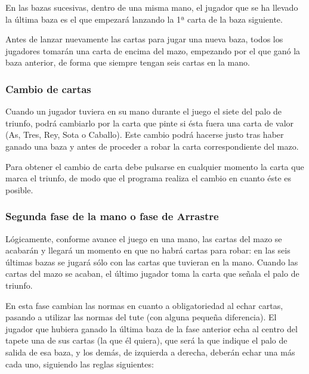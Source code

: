 \documentclass{article}
\begin{document}
En las bazas sucesivas, dentro de una misma mano, el jugador que se ha llevado la última baza es el que empezará lanzando la 1ª carta de la baza siguiente.

Antes de lanzar nuevamente las cartas para jugar una nueva baza, todos los jugadores tomarán una carta de encima del mazo, empezando por el que ganó la baza anterior, de forma que siempre tengan seis cartas en la mano.

\subsubsection*{Cambio de cartas}

Cuando un jugador tuviera en su mano durante el juego el siete del palo de triunfo, podrá cambiarlo por la carta que pinte si ésta fuera una carta de valor (As, Tres, Rey, Sota o Caballo). Este cambio podrá hacerse justo tras haber ganado una baza y antes de proceder a robar la carta correspondiente del mazo.

Para obtener el cambio de carta debe pulsarse en cualquier momento la carta que marca el triunfo, de modo que el programa realiza el cambio en cuanto éste es posible.

\subsubsection*{Segunda fase de la mano o fase de Arrastre}

Lógicamente, conforme avance el juego en una mano, las cartas del mazo se acabarán y llegará un momento en que no habrá cartas para robar: en las seis últimas bazas se jugará sólo con las cartas que tuvieran en la mano. Cuando las cartas del mazo se acaban, el último jugador toma la carta que señala el palo de triunfo.

En esta fase cambian las normas en cuanto a obligatoriedad al echar cartas, pasando a utilizar las normas del tute (con alguna pequeña diferencia). El jugador que hubiera ganado la última baza de la fase anterior echa al centro del tapete una de sus cartas (la que él quiera), que será la que indique el palo de salida de esa baza, y los demás, de izquierda a derecha, deberán echar una más cada uno, siguiendo las reglas siguientes:
\end{document}
